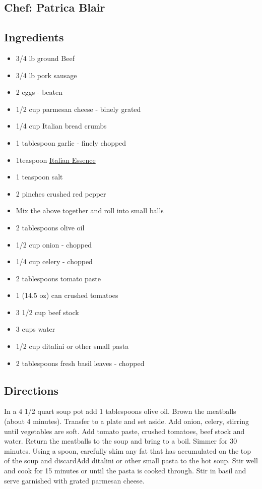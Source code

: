 \documentclass[
]{book}
\providecommand{\tightlist}{%
  \setlength{\itemsep}{0pt}\setlength{\parskip}{0pt}}
\begin{document}
\hypertarget{chef-patrica-blair}{%
\subsection*{Chef: Patrica Blair}\label{chef-patrica-blair}}


\hypertarget{ingredients-19}{%
\subsection*{Ingredients}\label{ingredients-19}}


\begin{itemize}
\tightlist
\item
  3/4 lb ground Beef
\item
  3/4 lb pork sausage
\item
  2 eggs - beaten
\item
  1/2 cup parmesan cheese - binely grated
\item
  1/4 cup Italian bread crumbs
\item
  1 tablespoon garlic - finely chopped
\item
  1teaspoon \href{https://www.emerils.com/121962/italian-essence}{Italian Essence}
\item
  1 teaspoon salt
\item
  2 pinches crushed red pepper
\item
  Mix the above together and roll into small balls
\item
  2 tablespoons olive oil
\item
  1/2 cup onion - chopped
\item
  1/4 cup celery - chopped
\item
  2 tablespoons tomato paste
\item
  1 (14.5 oz) can crushed tomatoes
\item
  3 1/2 cup beef stock
\item
  3 cups water
\item
  1/2 cup ditalini or other small pasta
\item
  2 tablespoons fresh basil leaves - chopped
\end{itemize}

\hypertarget{directions-19}{%
\subsection*{Directions}\label{directions-19}}


In a 4 1/2 quart soup pot add 1 tablespoons olive oil. Brown the meatballs (about 4 minutes). Transfer to a plate and set aside. Add onion, celery, stirring until vegetables are soft. Add tomato paste, crushed tomatoes, beef stock and water. Return the meatballs to the soup and bring to a boil. Simmer for 30 minutes. Using a spoon, carefully skim any fat that has accumulated on the top of the soup and discardAdd ditalini or other small pasta to the hot soup. Stir well and cook for 15 minutes or until the pasta is cooked through. Stir in basil and serve garnished with grated parmesan cheese.
\end{document}
